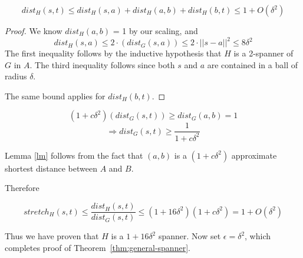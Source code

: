 \begin{lemma} 
$$dist_H(s,t) \leq dist_H(s,a)+dist_H(a,b)+dist_H(b,t) \leq 1+O(\delta^2)$$
\end{lemma}
\begin{proof}
We know $dist_H(a,b)$ = 1 by our scaling, and $$dist_H(s,a) \leq 2 \cdot (dist_G(s,a)) \leq 2 \cdot ||s-a||^2 \leq 8\delta^2$$
The first inequality follows by the inductive hypothesis that $H$ is a 2-spanner of $G$ in $A$. The third inequality follows since both $s$ and $a$ are contained in a ball of radius $\delta$.

The same bound applies for $dist_H(b,t)$.
\end{proof}

\begin{lemma} \label{lm}
$$(1+c\delta^2)(dist_G(s,t)) \geq dist_G(a,b) = 1$$
$$ \Rightarrow dist_G(s,t)  \geq \frac{1}{1+c\delta^2}$$
\end{lemma}

Lemma \ref{lm} follows from the fact that $(a,b)$ is a $(1+c\delta^2)$ approximate shortest distance between $A$ and $B$.

Therefore

\begin{equation}
stretch_H(s,t) \leq \frac{dist_H(s,t)}{dist_G(s,t)} \leq (1+16\delta^2)(1+c\delta^2) = 1+O(\delta^2)
\end{equation}


Thus we have proven that $H$ is a $1+16\delta^2$ spanner. Now set
$\epsilon = \delta^2$, which completes
proof of Theorem~\ref{thm:general-spanner}.
